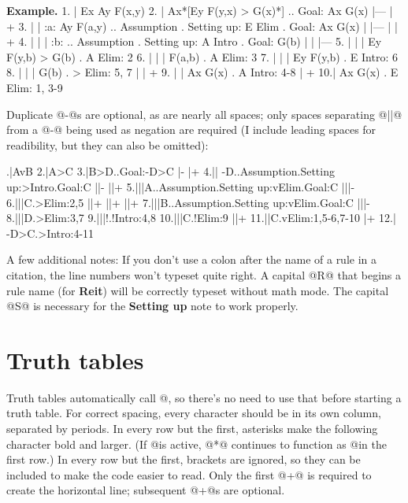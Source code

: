 {\bf Example. }
\fitchproofindentby{-12pt}
  1. | Ex Ay F(x,y)
  2. | Ax*[Ey F(y,x) > G(x)*]    ..    Goal: Ax G(x)
     |---
     |   +
  3. |   | :a: Ay F(a,y)         ..    Assumption . Setting up: E Elim   .  Goal: Ax G(x)
     |   |---
     |   |   +
  4. |   |   | :b:               ..    Assumption . Setting up: A Intro  .  Goal: G(b)
     |   |   |---
  5. |   |   | Ey F(y,b) > G(b)  .  A Elim: 2
  6. |   |   | F(a,b)            .  A Elim: 3
  7. |   |   | Ey F(y,b)         .  E Intro: 6
  8. |   |   | G(b)              .  > Elim: 5, 7
     |   |   +
  9. |   | Ax G(x)  .  A Intro: 4-8
     |   +
  10.| Ax G(x)      .  E Elim: 1, 3-9
\endfitchproof

Duplicate @-@s are optional, as are nearly all spaces; only spaces separating @||@ from a @-@ being used as negation are required (I include leading spaces for readibility, but they can also be omitted):

\nobreak
\endquantifiers
{}.|AvB
 2.|A>C
 3.|B>D..Goal:-D>C
   |-
   |+
 4.|| -D..Assumption.Setting up:>Intro.Goal:C
   ||-
   ||+
 5.|||A..Assumption.Setting up:vElim.Goal:C
   |||-
 6.|||C.>Elim:2,5
   ||+
   ||+
   ||+
 7.|||B..Assumption.Setting up:vElim.Goal:C
   |||-
 8.|||D.>Elim:3,7
 9.|||!.!Intro:4,8
10.|||C.!Elim:9
   ||+
11.||C.vElim:1,5-6,7-10
   |+
12.| -D>C.>Intro:4-11
\endfitchproof
\quantifiers

\noindent A few additional notes:
\unorderedlist
\li If you don't use a colon after the name of a rule in a citation, the line numbers won't typeset quite right. 
\li A capital @R@ that begins a rule name (for {\bf Reit}) will be correctly typeset without math mode.
\li The capital @S@ is necessary for the {\bf Setting up} note to work properly.
\endunorderedlist

\pagebreak

\section{Truth tables}

\unorderedlist
\li Truth tables automatically call @\endquantifiers@, so there's no need to use that before starting a truth table.
\li For correct spacing, every character should be in its own column, separated by periods.
\li In every row but the first, asterisks make the following character bold and larger. (If @\makeasteriskbig@ is active, @*@ continues to function as @\big@ in the first row.)
\li In every row but the first, brackets are ignored, so they can be included to make the code easier to read.
\li Only the first @+@ is required to create the horizontal line; subsequent @+@s are optional.
\endunorderedlist

